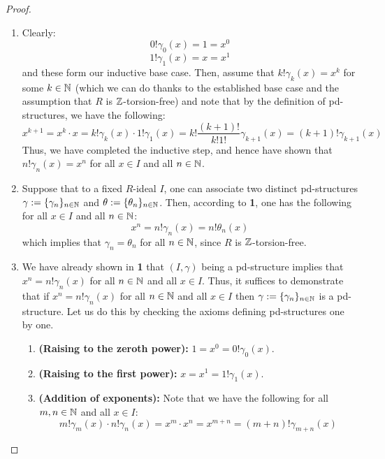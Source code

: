                 \begin{proof}
                    \noindent
                    \begin{enumerate}
                        \item Clearly:
                            $$0! \gamma_0(x) = 1 = x^0$$
                            $$1! \gamma_1(x) = x = x^1$$
                        and these form our inductive base case. Then, assume that $k! \gamma_k(x) = x^k$ for some $k \in \mathbb{N}$ (which we can do thanks to the established base case and the assumption that $R$ is $\mathbb{Z}$-torsion-free) and note that by the definition of pd-structures, we have the following:
                            $$x^{k + 1} = x^k \cdot x = k!\gamma_k(x) \cdot 1!\gamma_1(x) = k!\frac{(k + 1)!}{k! 1!} \gamma_{k + 1}(x) = (k + 1)!\gamma_{k + 1}(x)$$
                        Thus, we have completed the inductive step, and hence have shown that $n!\gamma_n(x) = x^n$ for all $x \in I$ and all $n \in \mathbb{N}$.
                        \item Suppose that to a fixed $R$-ideal $I$, one can associate two distinct pd-structures $\gamma := \{\gamma_n\}_{n \in \mathbb{N}}$ and $\theta := \{\theta_n\}_{n \in \mathbb{N}}$. Then, according to \textbf{1}, one has the following for all $x \in I$ and all $n \in \mathbb{N}$:
                            $$x^n = n!\gamma_n(x) = n!\theta_n(x)$$
                        which implies that $\gamma_n = \theta_n$ for all $n \in \mathbb{N}$, since $R$ is $\mathbb{Z}$-torsion-free.
                        \item We have already shown in \textbf{1} that $(I, \gamma)$ being a pd-structure implies that $x^n = n!\gamma_n(x)$ for all $n \in \mathbb{N}$ and all $x \in I$. Thus, it suffices to demonstrate that if $x^n = n!\gamma_n(x)$ for all $n \in \mathbb{N}$ and all $x \in I$ then $\gamma := \{\gamma_n\}_{n \in \mathbb{N}}$ is a pd-structure. Let us do this by checking the axioms defining pd-structures one by one.
                            \begin{enumerate}
                                \item \textbf{(Raising to the zeroth power):} $1 = x^0 = 0! \gamma_0(x)$.
                                \item \textbf{(Raising to the first power):} $x = x^1 = 1! \gamma_1(x)$.
                                \item \textbf{(Addition of exponents):} Note that we have the following for all $m, n \in \mathbb{N}$ and all $x \in I$:
                                    $$m!\gamma_m(x) \cdot n!\gamma_n(x) = x^m \cdot x^n = x^{m + n} = (m + n)!\gamma_{m + n}(x)$$

\end{enumerate}
\end{enumerate}
\end{proof}
